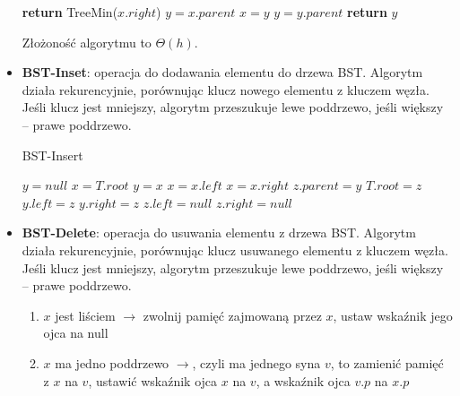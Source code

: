 \documentclass[11pt,a4paper]{article}
\begin{document}
\begin{itemize}
\begin{algorithm}
           \begin{algorithmic}[1]
               \State \textbf{return} TreeMin($x.right$)
               \Else
               \State $y = x.parent$
               \State $x = y$
               \State $y = y.parent$
               \EndWhile
               \State \textbf{return} $y$
               \EndIf
               \EndProcedure
           \end{algorithmic}
        \end{algorithm}
        Złożoność algorytmu to $\Theta(h)$.
    \item \textbf{BST-Inset}: operacja do dodawania elementu do drzewa BST. Algorytm działa rekurencyjnie, porównując klucz nowego elementu z kluczem węzła. Jeśli klucz jest mniejszy, algorytm przeszukuje lewe poddrzewo, jeśli większy -- prawe poddrzewo.
        \begin{algorithm}
            \caption{BST-Insert}
            \begin{algorithmic}[1]
                \State $y = null$
                \State $x = T.root$
                    \State $y = x$
                        \State $x = x.left$
                    \Else
                        \State $x = x.right$
                    \EndIf
                \EndWhile
                $z.parent = y$
                    $T.root = z$
                    $y.left = z$
                \Else
                    $y.right = z$
                \EndIf
                $z.left = null$
                $z.right = null$
                \EndProcedure
            \end{algorithmic}
        \end{algorithm}
    \item \textbf{BST-Delete}: operacja do usuwania elementu z drzewa BST. Algorytm działa rekurencyjnie, porównując klucz usuwanego elementu z kluczem węzła. Jeśli klucz jest mniejszy, algorytm przeszukuje lewe poddrzewo, jeśli większy -- prawe poddrzewo.
        \begin{enumerate}
            \item $x$ jest liściem $\rightarrow$ zwolnij pamięć zajmowaną przez $x$, ustaw wskaźnik jego ojca na null
            \item $x$ ma jedno poddrzewo $\rightarrow$, czyli ma jednego syna $v$, to zamienić pamięć z $x$ na $v$, ustawić wskaźnik ojca $x$ na $v$, a wskaźnik ojca $v.p$ na $x.p$

\end{enumerate}
\end{itemize}
\end{document}
